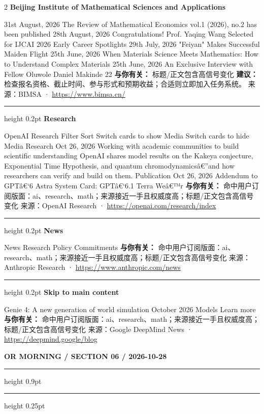 \documentclass[10.5pt]{ctexart}
\begin{document}
\begin{multicols}{2}
{\large\bfseries Beijing Institute of Mathematical Sciences and Applications}\par
31st August, 2026 The Review of Mathematical Economics vol.1 (2026), no.2 has been published 28th August, 2026 Congratulations! Prof. Yaqing Wang Selected for IJCAI 2026 Early Career Spotlights 29th July, 2026 "Feiyan" Makes Successful Maiden Flight 25th June, 2026 When Materials Science Meets Mathematics: How to Understand Complex Materials 25th June, 2026 An Exclusive Interview with Fellow Oluwole Daniel Makinde 22
\textbf{与你有关：} 标题/正文包含高信号变化
\textbf{建议：} 检查报名资格、截止时间、参与形式和预期收益；合适则立即加入任务系统。
{\footnotesize\color{ormuted} 来源：BIMSA · \url{https://www.bimsa.cn/}}
\vspace{2mm}
\hrule height 0.2pt
\vspace{2mm}
{\large\bfseries Research}\par
OpenAI Research Filter Sort Switch cards to show Media Switch cards to hide Media Research Oct 26, 2026 Working with academic communities to build scientific understanding OpenAI shares model results on the Kakeya conjecture, Exponential Time Hypothesis, and quantum chromodynamicsâ€”and how researchers can verify and build on them. Publication Oct 26, 2026 Addendum to GPTâ€‘6 Astra System Card: GPTâ€‘6.1 Terra Weâ€™r
\textbf{与你有关：} 命中用户订阅版面：ai、research、math；来源接近一手且权威度高；标题/正文包含高信号变化
{\footnotesize\color{ormuted} 来源：OpenAI Research · \url{https://openai.com/research/index}}
\vspace{2mm}
\hrule height 0.2pt
\vspace{2mm}
{\large\bfseries News}\par
News Research Policy Commitments
\textbf{与你有关：} 命中用户订阅版面：ai、research、math；来源接近一手且权威度高；标题/正文包含高信号变化
{\footnotesize\color{ormuted} 来源：Anthropic Research · \url{https://www.anthropic.com/news}}
\vspace{2mm}
\hrule height 0.2pt
\vspace{2mm}
{\large\bfseries Skip to main content}\par
Genie 4: A new generation of world simulation October 2026 Models Learn more
\textbf{与你有关：} 命中用户订阅版面：ai、research、math；来源接近一手且权威度高；标题/正文包含高信号变化
{\footnotesize\color{ormuted} 来源：Google DeepMind News · \url{https://deepmind.google/blog}}
\end{multicols}
\newpage
{\small\bfseries OR MORNING / SECTION 06 / 2026-10-28}
\vspace{2mm}
\hrule height 0.9pt
\vspace{1.5mm}
\hrule height 0.25pt
\vspace{4mm}
\end{document}
